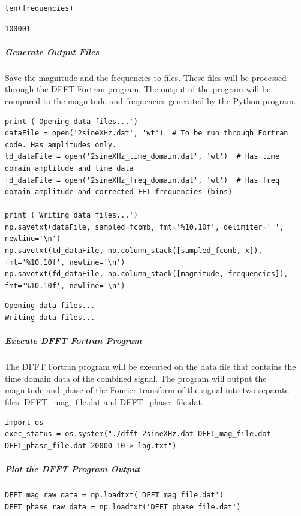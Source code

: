 \begin{verbatim}
len(frequencies)
\end{verbatim}

\begin{verbatim}
100001
\end{verbatim}

\subparagraph{Generate Output Files}

Save the magnitude and the frequencies to files.  These files will be processed through the DFFT Fortran program.  The output of the program will be compared to the magnitude and frequencies generated by the Python program.

\begin{verbatim}
print ('Opening data files...')
dataFile = open('2sineXHz.dat', 'wt')  # To be run through Fortran code. Has amplitudes only.
td_dataFile = open('2sineXHz_time_domain.dat', 'wt')  # Has time domain amplitude and time data
fd_dataFile = open('2sineXHz_freq_domain.dat', 'wt')  # Has freq domain amplitude and corrected FFT frequencies (bins)

print ('Writing data files...')
np.savetxt(dataFile, sampled_fcomb, fmt='%10.10f', delimiter=' ', newline='\n')
np.savetxt(td_dataFile, np.column_stack([sampled_fcomb, x]), fmt='%10.10f', newline='\n')
np.savetxt(fd_dataFile, np.column_stack([magnitude, frequencies]), fmt='%10.10f', newline='\n')
\end{verbatim}

\begin{verbatim}
Opening data files...
Writing data files...
\end{verbatim}

\subparagraph{Execute DFFT Fortran Program}

The DFFT Fortran program will be executed on the data file that contains the time domain data of the combined signal.  The program will output the magnitude and phase of the Fourier transform of the signal into two separate files: DFFT\_mag\_file.dat and DFFT\_phase\_file.dat.

\begin{verbatim}
import os
exec_status = os.system("./dfft 2sineXHz.dat DFFT_mag_file.dat DFFT_phase_file.dat 20000 10 > log.txt")
\end{verbatim}

\subparagraph{Plot the DFFT Program Output}

\begin{verbatim}
DFFT_mag_raw_data = np.loadtxt('DFFT_mag_file.dat')
DFFT_phase_raw_data = np.loadtxt('DFFT_phase_file.dat')
\end{verbatim}

